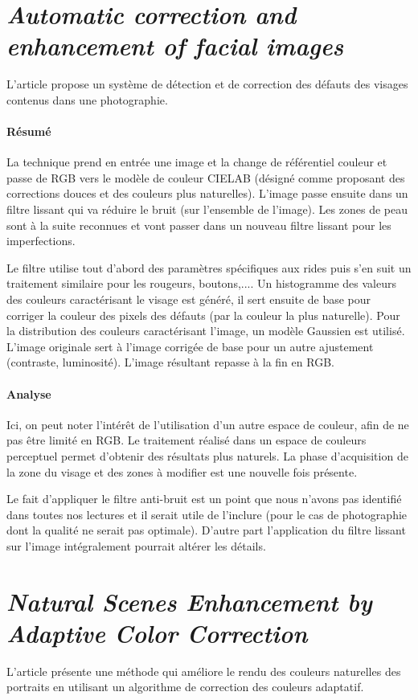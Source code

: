 \documentclass[11pt, french]{report-rd-info}
\begin{document}
\section{\emph{Automatic correction and enhancement of facial images}}
L'article \cite{Konoplev2012} propose un système de détection et de correction des défauts des visages contenus dans une photographie.

\paragraph{Résumé}
La technique prend en entrée une image et la change de référentiel couleur et passe de RGB vers le modèle de couleur CIELAB (désigné comme proposant des corrections douces et des couleurs plus naturelles). L'image passe ensuite dans un filtre lissant qui va réduire le bruit (sur l’ensemble de l’image). Les zones de peau sont à la suite reconnues et vont passer dans un nouveau filtre lissant pour les imperfections. 

Le filtre utilise tout d'abord des paramètres spécifiques aux rides puis s'en suit un traitement similaire pour les rougeurs, boutons,.... Un histogramme des valeurs des couleurs caractérisant le visage est généré, il sert ensuite de base pour corriger la couleur des pixels des défauts (par la couleur la plus naturelle). Pour la distribution des couleurs caractérisant l'image, un modèle Gaussien est utilisé. L’image originale sert à l'image corrigée de base pour un autre ajustement (contraste, luminosité). L'image résultant repasse à la fin en RGB.

\paragraph{Analyse}
Ici, on peut noter l'intérêt de l'utilisation d'un autre espace de couleur, afin de ne pas être limité en RGB. Le traitement réalisé dans un espace de couleurs perceptuel permet d'obtenir des résultats plus naturels. La phase d'acquisition de la zone du visage et des zones à modifier est une nouvelle fois présente. 

Le fait d’appliquer le filtre anti-bruit est un point que nous n’avons pas identifié dans toutes nos lectures et il serait utile de l’inclure (pour le cas de photographie dont la qualité ne serait pas optimale). D’autre part l’application du filtre lissant sur l’image intégralement pourrait altérer les détails.

\section{\emph{Natural Scenes Enhancement by Adaptive Color Correction}}
L'article \cite{Naccari} présente une méthode qui améliore le rendu des couleurs naturelles des portraits en utilisant un algorithme de correction des couleurs adaptatif.
\end{document}
